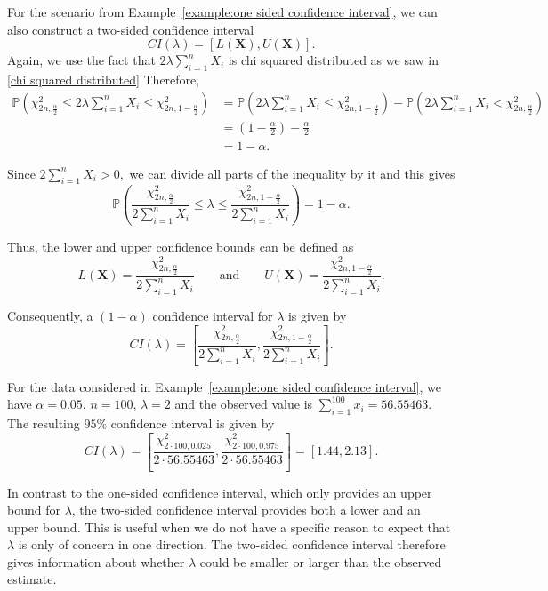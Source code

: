 \begin{example}
For the scenario from Example~\ref{example:one sided confidence interval}, we can also construct a two-sided confidence interval
\[
	CI(\lambda) = [L(\mathbf X), U(\mathbf X)].
\]
Again, we use the fact that $2\lambda\sum_{i=1}^n X_i$ is chi squared distributed as we saw in \eqref{chi squared distributed}
Therefore,
\begin{align*}
	\mathbb{P}\left(
	\chi^2_{2n,\frac{\alpha}{2}}
	\leq
	2\lambda\sum_{i=1}^n X_i
	\leq
	\chi^2_{2n,1-\frac{\alpha}{2}}
	\right)
	&=
	\mathbb{P}\left(
	2\lambda\sum_{i=1}^n X_i
	\leq
	\chi^2_{2n,1-\frac{\alpha}{2}}
	\right)
	-
	\mathbb{P}\left(
	2\lambda\sum_{i=1}^n X_i
	<
	\chi^2_{2n,\frac{\alpha}{2}}
	\right) 
	\\
	&=
	\left(1-\frac{\alpha}{2}\right) - \frac{\alpha}{2}
	\\
	&=
	1-\alpha.
\end{align*}

Since
\(
2\sum_{i=1}^n X_i > 0,
\)
we can divide all parts of the inequality by it and this gives
\[
	\mathbb{P}\left(
	\frac{\chi^2_{2n,\frac{\alpha}{2}}}
	{2\sum_{i=1}^n X_i}
	\leq
	\lambda
	\leq
	\frac{\chi^2_{2n,1-\frac{\alpha}{2}}}
	{2\sum_{i=1}^n X_i}
	\right)
	=
	1-\alpha.
\]

Thus, the lower and upper confidence bounds can be defined as
\[
	L(\mathbf X)
	=
	\frac{\chi^2_{2n,\frac{\alpha}{2}}}
	{2\sum_{i=1}^n X_i}
	\qquad\text{and}\qquad
	U(\mathbf X)
	=
	\frac{\chi^2_{2n,1-\frac{\alpha}{2}}}
	{2\sum_{i=1}^n X_i}.
\]

Consequently, a $(1-\alpha)$ confidence interval for $\lambda$ is given by
\[
	CI(\lambda)
	=
	\left[
	\frac{\chi^2_{2n,\frac{\alpha}{2}}}
	{2\sum_{i=1}^n X_i},
	\frac{\chi^2_{2n,1-\frac{\alpha}{2}}}
	{2\sum_{i=1}^n X_i}
	\right].
\]

For the data considered in Example~\ref{example:one sided confidence interval}, we have $\alpha=0.05$, $n=100$, $\lambda=2$
and the observed value is
\(
	\sum_{i=1}^{100}x_i=56.55463
\).
The resulting $95\%$ confidence interval is given by
\[
	CI(\lambda)
	=
	\left[
	\frac{\chi^2_{2\cdot100,0.025}}
	{2\cdot56.55463},
	\frac{\chi^2_{2\cdot100,0.975}}
	{2\cdot56.55463}
	\right]
	=
	[1.44, 2.13].
\]


In contrast to the one-sided confidence interval, which only provides an upper bound for $\lambda$, the two-sided confidence interval provides both a lower and an upper bound. This is useful when we do not have a specific reason to expect that $\lambda$ is only of concern in one direction. The two-sided confidence interval therefore gives information about whether $\lambda$ could be  smaller or larger than the observed estimate.


\end{example}
